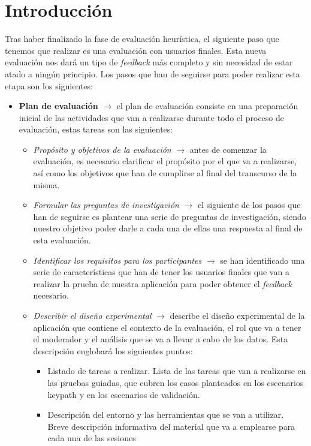 \section{Introducción}
Tras haber finalizado la fase de evaluación heurística, el siguiente paso que tenemos que realizar es una evaluación con usuarios finales. Esta nueva evaluación nos dará un
tipo de \textit{feedback} más completo y sin necesidad de estar atado a ningún principio. Los pasos que han de seguirse para poder realizar esta etapa son los siguientes:
\begin{itemize}
    \item \textbf{Plan de evaluación} $\rightarrow$ el plan de evaluación consiste en una preparación inicial de las actividades que van a realizarse durante todo el proceso
    de evaluación, estas tareas son las siguientes:
    \begin{itemize}
        \item \textit{Propósito y objetivos de la evaluación} $\rightarrow$ antes de comenzar la evaluación, es necesario clarificar el propósito por el que va a realizarse,
        así como los objetivos que han de cumplirse al final del transcurso de la misma.
        \item \textit{Formular las preguntas de investigación} $\rightarrow$ el siguiente de los pasos que han de seguirse es plantear una serie de preguntas de investigación,
        siendo nuestro objetivo poder darle a cada una de ellas una respuesta al final de esta evaluación.
        \item \textit{Identificar los requisitos para los participantes} $\rightarrow$ se han identificado una serie de características que han de tener los usuarios finales 
        que van a realizar la prueba de nuestra aplicación para poder obtener el \textit{feedback} necesario.
        \item \textit{Describir el diseño experimental} $\rightarrow$ describe el diseño experimental de la aplicación que contiene el contexto de la evaluación, el rol
        que va a tener el moderador y el análisis que se va a llevar a cabo de los datos. Esta descripción englobará los siguientes puntos:
        \begin{itemize}
            \item Listado de tareas a realizar. Lista de las tareas que van a realizarse en las pruebas guiadas, que cubren los casos planteados en los escenarios keypath
            y en los escenarios de validación.
            \item Descripción del entorno y las herramientas que se van a utilizar. Breve descripción informativa del material que va a emplearse para cada una de las sesiones

\end{itemize}
\end{itemize}
\end{itemize}
